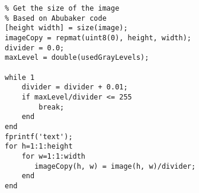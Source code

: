 \begin{verbatim}
% Get the size of the image
% Based on Abubaker code
[height width] = size(image);
imageCopy = repmat(uint8(0), height, width);
divider = 0.0;
maxLevel = double(usedGrayLevels);

while 1
    divider = divider + 0.01;
    if maxLevel/divider <= 255
        break;
    end
end
fprintf('text');
for h=1:1:height
    for w=1:1:width
       imageCopy(h, w) = image(h, w)/divider;
    end
end
\end{verbatim}



